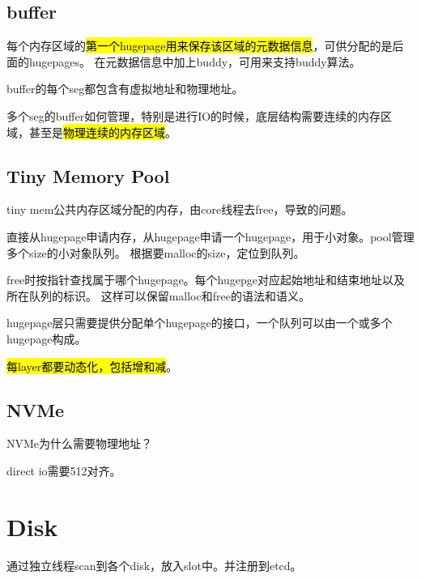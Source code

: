 \subsection{buffer}


每个内存区域的\hl{第一个hugepage用来保存该区域的元数据信息}，可供分配的是后面的hugepages。
在元数据信息中加上buddy，可用来支持buddy算法。

buffer的每个seg都包含有虚拟地址和物理地址。

多个seg的buffer如何管理，特别是进行IO的时候，底层结构需要连续的内存区域，甚至是\hl{物理连续的内存区域}。

\subsection{Tiny Memory Pool}


tiny mem公共内存区域分配的内存，由core线程去free，导致的问题。

直接从hugepage申请内存，从hugepage申请一个hugepage，用于小对象。pool管理多个size的小对象队列。
根据要malloc的size，定位到队列。

free时按指针查找属于哪个hugepage。每个hugepge对应起始地址和结束地址以及所在队列的标识。
这样可以保留malloc和free的语法和语义。

hugepage层只需要提供分配单个hugepage的接口，一个队列可以由一个或多个hugepage构成。


\hl{每layer都要动态化，包括增和减}。

\subsection{NVMe}

NVMe为什么需要物理地址？

direct io需要512对齐。

\section{Disk}


通过独立线程scan到各个disk，放入slot中。并注册到etcd。


